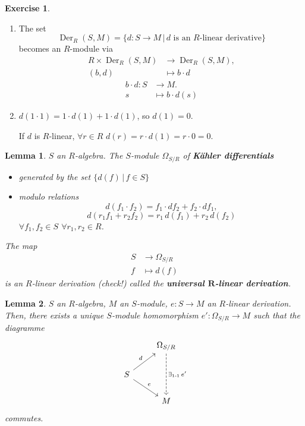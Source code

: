 \documentclass[12pt]{article}
\DeclareMathOperator{\Der}{Der}
\newtheorem*{lemma}{Lemma}
\theoremstyle{definition}
\newtheorem*{exercise}{Exercise}
\begin{document}
\begin{exercise}
\begin{enumerate}[label=\arabic*)]
\item The set
\[\Der_R(S,M)=\{d:S\rightarrow M\,|\,d\text{ is an }R\text{-linear derivative}\}\]
becomes an $R$-module via
\begin{align*}
R\times\Der_R(S,M)&\longrightarrow\Der_R(S,M),\\(b,d)&\longmapsto b\cdot d
\end{align*}
\begin{align*}
b\cdot d:S&\longrightarrow M.\\s&\longmapsto b\cdot d(s)
\end{align*}
\item $d(1\cdot1)=1\cdot d(1)+1\cdot d(1)$, so $d(1)=0$.

If $d$ is $R$-linear, $\forall r\in R$ $d(r)=r\cdot d(1)=r\cdot0=0$.
\end{enumerate}
\end{exercise}

\begin{lemma}
$S$ an $R$-algebra. The $S$-module $\Omega_{S/R}$ of \textbf{K\"ahler differentials}
\begin{itemize}[label=$-$]
\item generated by the set $\{d(f)\,|\,f\in S\}$
\item modulo relations
\[d(f_1\cdot f_2)=f_1\cdot df_2+f_2\cdot df_1,\]
\[d(r_1f_1+r_2f_2)=r_1\,d(f_1)+r_2\,d(f_2)\]
$\forall f_1,f_2\in S$ $\forall r_1,r_2\in R$.
\end{itemize}

The map
\begin{align*}
S&\longrightarrow\Omega_{S/R}\\f&\longmapsto d(f)
\end{align*}
is an $R$-linear derivation (check!) called the \textbf{universal $\boldsymbol R$-linear derivation}.
\end{lemma}

\begin{lemma}
$S$ an $R$-algebra, $M$ an $S$-module, $e:S\rightarrow M$ an $R$-linear derivation. Then, there exists a unique $S$-module homomorphism $e':\Omega_{S/R}\rightarrow M$ such that the diagramme
\[\begin{tikzcd}&\Omega_{S/R}\arrow[dd,dashed,"\exists_{1\text-1}\,e'"]\\S\arrow[ru,"d"]\arrow[rd,"e"]\\&M\end{tikzcd}\]
commutes.
\end{lemma}
\end{document}
